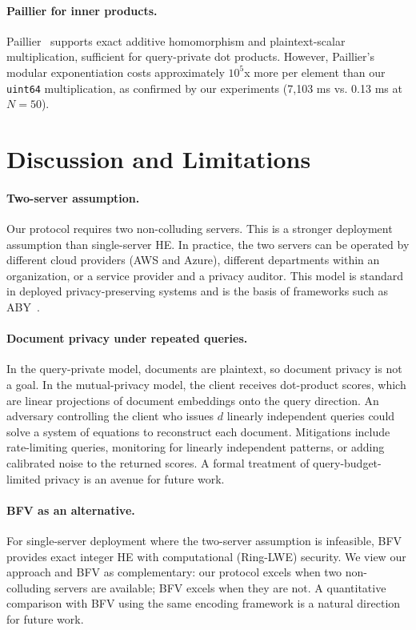\documentclass[11pt]{article}
\begin{document}
\paragraph{Paillier for inner products.}
Paillier~\cite{paillier1999public} supports exact additive homomorphism and plaintext-scalar multiplication, sufficient for query-private dot products. However, Paillier's modular exponentiation costs approximately $10^5$x more per element than our \texttt{uint64} multiplication, as confirmed by our experiments (7{,}103 ms vs. 0.13 ms at $N = 50$).


\section{Discussion and Limitations}
\label{sec:discussion}

\paragraph{Two-server assumption.} Our protocol requires two non-colluding servers. This is a stronger deployment assumption than single-server HE. In practice, the two servers can be operated by different cloud providers (AWS and Azure), different departments within an organization, or a service provider and a privacy auditor. This model is standard in deployed privacy-preserving systems and is the basis of frameworks such as ABY~\cite{demmler2015aby}.

\paragraph{Document privacy under repeated queries.} In the query-private model, documents are plaintext, so document privacy is not a goal. In the mutual-privacy model, the client receives dot-product scores, which are linear projections of document embeddings onto the query direction. An adversary controlling the client who issues $d$ linearly independent queries could solve a system of equations to reconstruct each document. Mitigations include rate-limiting queries, monitoring for linearly independent patterns, or adding calibrated noise to the returned scores. A formal treatment of query-budget-limited privacy is an avenue for future work.

\paragraph{BFV as an alternative.} For single-server deployment where the two-server assumption is infeasible, BFV~\cite{fan2012somewhat} provides exact integer HE with computational (Ring-LWE) security. We view our approach and BFV as complementary: our protocol excels when two non-colluding servers are available; BFV excels when they are not. A quantitative comparison with BFV using the same encoding framework is a natural direction for future work.
\end{document}
